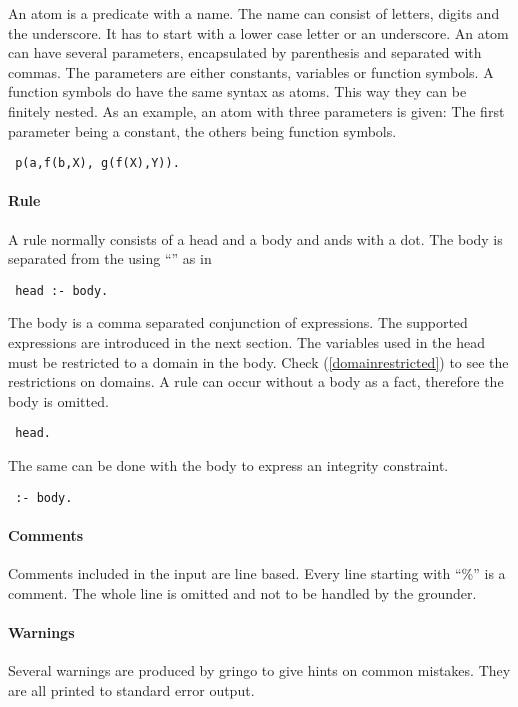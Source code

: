 \documentclass[a4paper,10pt]{article}
\begin{document}
An atom is a predicate with a name. The name can consist of letters, digits and the underscore.
It has to start with a lower case letter or an underscore.
An atom can have several parameters, encapsulated by parenthesis and separated with commas.
The parameters are either constants, variables or function symbols.
A function symbols do have the same syntax as atoms. This way they can be finitely nested.
As an example, an atom with three parameters is given:
The first parameter being a constant, the others being function symbols.
\begin{verbatim}
 p(a,f(b,X), g(f(X),Y)).
\end{verbatim}

\paragraph{Rule}
A rule normally consists of a head and a body and ands with a dot.
The body is separated from the using ``\:\-'' as in
\begin{verbatim}
 head :- body.
\end{verbatim}
The body is a comma separated conjunction of expressions.
The supported expressions are introduced in the next section.
The variables used in the head must be restricted to a domain in the body.
Check (\ref{domainrestricted}) to see the restrictions on domains.
\newline
A rule can occur without a body as a fact, therefore the body is omitted.
\begin{verbatim}
 head.
\end{verbatim}
The same can be done with the body to express an integrity constraint.
\begin{verbatim}
 :- body.
\end{verbatim}

\paragraph{Comments}
Comments included in the input are line based.
Every line starting with ``\%'' is a comment. The whole line is omitted and not to be handled by the grounder.
\paragraph{Warnings}
Several warnings are produced by gringo to give hints on common mistakes.
They are all printed to standard error output.
\end{document}
